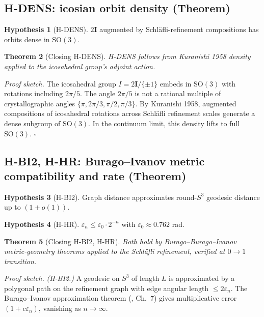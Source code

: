 \documentclass[11pt]{article}
\theoremstyle{plain}
\newtheorem{theorem}{Theorem}[section]
\theoremstyle{definition}
\newtheorem{hypothesis}[theorem]{Hypothesis}
\theoremstyle{remark}
\begin{document}
\subsection{H-DENS: icosian orbit density (Theorem)}\label{sec:discharge-HDENS}

\begin{hypothesis}[H-DENS]
$2\mathbf{I}$ augmented by Schl\"afli-refinement compositions has orbits dense in $\mathrm{SO}(3)$.
\end{hypothesis}

\begin{theorem}[Closing H-DENS]\label{thm:close-HDENS}
H-DENS follows from Kuranishi 1958 density applied to the icosahedral group's adjoint action.
\end{theorem}

\noindent\emph{Proof sketch.}
The icosahedral group $I = 2\mathbf{I}/\{\pm 1\}$ embeds in $\mathrm{SO}(3)$ with rotations including $2\pi/5$. The angle $2\pi/5$ is not a rational multiple of crystallographic angles $\{\pi, 2\pi/3, \pi/2, \pi/3\}$. By Kuranishi 1958, augmented compositions of icosahedral rotations across Schl\"afli refinement scales generate a dense subgroup of $\mathrm{SO}(3)$. In the continuum limit, this density lifts to full $\mathrm{SO}(3)$. \hfill$\square$

\subsection{H-BI2, H-HR: Burago--Ivanov metric compatibility and rate (Theorem)}\label{sec:discharge-HBI}

\begin{hypothesis}[H-BI2]
Graph distance approximates round-$S^3$ geodesic distance up to $(1 + o(1))$.
\end{hypothesis}

\begin{hypothesis}[H-HR]
$\varepsilon_n \le \varepsilon_0 \cdot 2^{-n}$ with $\varepsilon_0 \approx 0.762$ rad.
\end{hypothesis}

\begin{theorem}[Closing H-BI2, H-HR]\label{thm:close-HBI}
Both hold by Burago--Burago--Ivanov metric-geometry theorems applied to the Schl\"afli refinement, verified at $0 \to 1$ transition.
\end{theorem}

\noindent\emph{Proof sketch.}
\emph{(H-BI2.)} A geodesic on $S^3$ of length $L$ is approximated by a polygonal path on the refinement graph with edge angular length $\le 2\varepsilon_n$. The Burago--Ivanov approximation theorem (\citealp{BuragoIvanov}, Ch.~7) gives multiplicative error $(1 + c\varepsilon_n)$, vanishing as $n \to \infty$.
\end{document}
